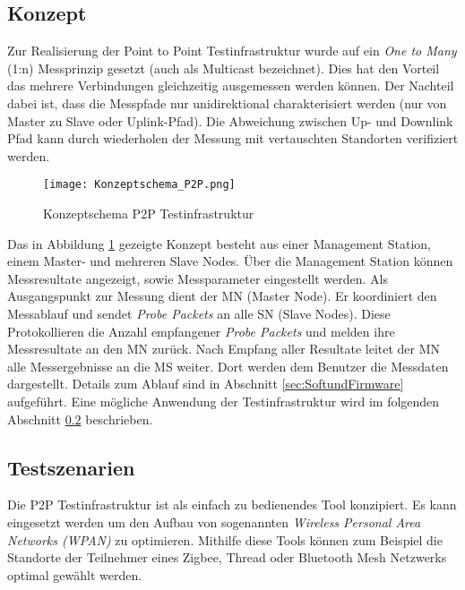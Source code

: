 \subsection{Konzept}\label{sec:KonzeptP2P}
Zur Realisierung der Point to Point Testinfrastruktur wurde auf ein \textit{One to Many} (1:n) Messprinzip gesetzt (auch als Multicast bezeichnet). Dies hat den Vorteil das mehrere Verbindungen gleichzeitig ausgemessen werden können. Der Nachteil dabei ist, dass die Messpfade nur unidirektional charakterisiert werden (nur von Master zu Slave oder Uplink-Pfad). Die Abweichung zwischen Up- und Downlink Pfad kann durch wiederholen der Messung mit vertauschten Standorten verifiziert werden. 

\begin{figure} [H]
	\centering
	\texttt{[image: Konzeptschema\_P2P.png]}
	\caption{Konzeptschema P2P Testinfrastruktur}
	\label{fig:KonzeptschemaP2P}
\end{figure}


Das in Abbildung \ref{fig:KonzeptschemaP2P} gezeigte Konzept besteht aus einer Management Station, einem Master- und mehreren Slave Nodes. Über die Management Station können Messresultate angezeigt, sowie Messparameter eingestellt werden. Als Ausgangspunkt zur Messung dient der MN (Master Node). Er koordiniert den Messablauf und sendet \textit{Probe Packets} an alle SN (Slave Nodes). Diese Protokollieren die Anzahl empfangener \textit{Probe Packets} und melden ihre Messresultate an den MN zurück. Nach Empfang aller Resultate leitet der MN alle Messergebnisse an die MS weiter. Dort werden dem Benutzer die Messdaten dargestellt. Details zum Ablauf sind in Abschnitt \ref{sec:SoftundFirmware} aufgeführt. Eine mögliche Anwendung der Testinfrastruktur wird im folgenden Abschnitt \ref{sec:TestszenarienP2P} beschrieben.  

\subsection{Testszenarien}\label{sec:TestszenarienP2P}
Die P2P Testinfrastruktur ist als einfach zu bedienendes Tool konzipiert.
Es kann eingesetzt werden um den Aufbau von sogenannten \textit{Wireless Personal Area Networks (WPAN)} zu optimieren.
Mithilfe diese Tools können zum Beispiel die Standorte der Teilnehmer eines Zigbee, Thread oder Bluetooth Mesh Netzwerks optimal gewählt werden.

